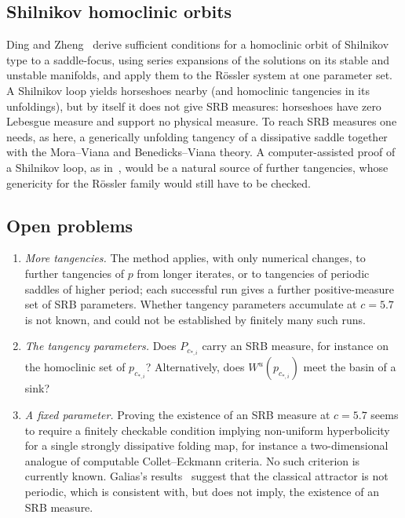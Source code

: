 \documentclass[11pt]{amsart}
\theoremstyle{definition}
\theoremstyle{remark}
\newcommand{\Wu}{W^u}
\begin{document}
\subsection*{Shilnikov homoclinic orbits}
Ding and Zheng~\cite{DZ23} derive sufficient conditions for a homoclinic orbit of Shilnikov type to a
saddle-focus, using series expansions of the solutions on its stable and unstable manifolds, and apply them to
the R\"ossler system at one parameter set. A Shilnikov loop yields horseshoes nearby (and homoclinic tangencies
in its unfoldings), but by itself it does not give SRB measures: horseshoes have zero Lebesgue measure and
support no physical measure. To reach SRB measures one needs, as here, a generically unfolding tangency of a
dissipative saddle together with the Mora--Viana and Benedicks--Viana theory. A computer-assisted proof of a
Shilnikov loop, as in~\cite{CW17}, would be a natural source of further tangencies, whose genericity for the
R\"ossler family would still have to be checked.

\subsection*{Open problems}
\begin{enumerate}[leftmargin=*]
\item \emph{More tangencies.} The method applies, with only numerical changes, to further tangencies of $p$ from
longer iterates, or to tangencies of periodic saddles of higher period; each successful run gives a further
positive-measure set of SRB parameters. Whether tangency parameters accumulate at $c=5.7$ is not known, and
could not be established by finitely many such runs.
\item \emph{The tangency parameters.} Does $P_{c_{*,i}}$ carry an SRB measure, for instance on the homoclinic set
of $p_{c_{*,i}}$? Alternatively, does $\Wu(p_{c_{*,i}})$ meet the basin of a sink?
\item \emph{A fixed parameter.} Proving the existence of an SRB measure at $c=5.7$ seems to require a finitely
checkable condition implying non-uniform hyperbolicity for a single strongly dissipative folding map, for
instance a two-dimensional analogue of computable Collet--Eckmann criteria. No such criterion is currently
known. Galias's results~\cite{Gal26} suggest that the classical attractor is not periodic, which is consistent
with, but does not imply, the existence of an SRB measure.
\end{enumerate}
\end{document}
